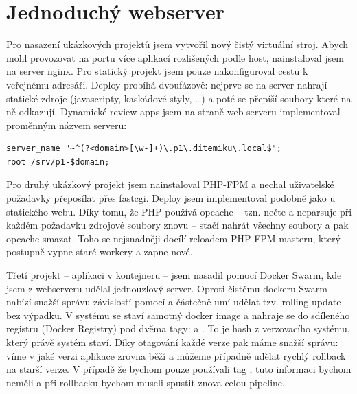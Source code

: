 \section{Jednoduchý webserver}
    Pro nasazení ukázkových projektů jsem vytvořil nový čistý virtuální stroj. Abych mohl provozovat na \HTTP portu více aplikací rozlišených podle host, nainstaloval jsem na server nginx. Pro statický projekt jsem pouze nakonfiguroval cestu k veřejnému adresáři. Deploy probíhá dvoufázově: nejprve se na server nahrají statické zdroje (javascripty, kaskádové styly, \ldots) a poté se přepíší  soubory které na ně odkazují. Dynamické review apps jsem na straně web serveru implementoval proměnným názvem serveru:

        \begin{verbatim}
server_name "~^(?<domain>[\w-]+)\.p1\.ditemiku\.local$";
root /srv/p1-$domain;
        \end{verbatim}

    Pro druhý ukázkový projekt jsem nainstaloval PHP-FPM a nechal uživatelské požadavky přeposílat přes fastcgi. Deploy jsem implementoval podobně jako u statického webu. Díky tomu, že PHP používá opcache -- tzn. nečte a neparsuje při každém požadavku zdrojové soubory znovu -- stačí nahrát všechny soubory a pak opcache smazat. Toho se nejsnadněji docílí reloadem PHP-FPM masteru, který postupně vypne staré workery a zapne nové.

    Třetí projekt -- aplikaci v kontejneru -- jsem nasadil pomocí Docker Swarm, kde jsem z webserveru udělal jednouzlový server. Oproti čistému dockeru Swarm nabízí snažší správu závislostí pomocí  a částečně umí udělat tzv. rolling update bez výpadku. V \CI systému se staví samotný docker image a nahraje se do sdíleného registru (Docker Registry) pod dvěma tagy:  a . To je hash z verzovacího systému, který právě \CI systém staví. Díky otagování každé verze pak máme snažší správu: víme v jaké verzi aplikace zrovna běží a můžeme případně udělat rychlý rollback na starší verze. V případě že bychom pouze používali tag , tuto informaci bychom neměli a při rollbacku bychom museli spustit znova celou \CI pipeline.
